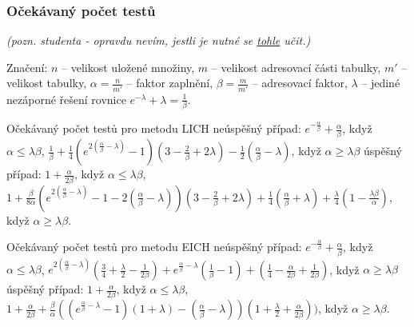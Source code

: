 \documentclass[a4paper,12pt]{article}
\begin{document}
\subsubsection{Očekávaný počet testů}
\emph{(pozn. studenta - opravdu nevím, jestli je nutné se \underline{tohle} učit.)}

Značení: $n$ -- velikost uložené množiny,\newline 
$m$ -- velikost adresovací části tabulky,\newline 
$m'$ -- velikost tabulky,\newline 
$\alpha =\frac n{m'}$ -- faktor zaplnění,\newline 
$\beta =\frac m{m'}$ -- adresovací faktor,\newline 
$\lambda$ -- jediné nezáporné řešení rovnice $e^{
-\lambda}+\lambda =\frac 1{\beta}$.

Očekávaný počet testů pro metodu LICH\newline 
neúspěšný případ:\newline 
\phantom{---}$e^{-\frac {\alpha}{\beta}}+\frac {\alpha}{\beta}$, když  $
\alpha\le\lambda\beta$, \newline 
\phantom{---}$\frac 1{\beta}+\frac 14(e^{2(\frac {\alpha}{\beta}-
\lambda )}-1)(3-\frac 2{\beta}+2\lambda )-\frac 12(\frac {\alpha}{
\beta}-\lambda )$, když $\alpha\ge\lambda\beta$\newline 
úspěšný případ:\newline 
\phantom{---}$1+\frac {\alpha}{2\beta}$, když $\alpha\le\lambda
\beta$, \newline 
\phantom{---}$1+\frac {\beta}{8\alpha}(e^{2(\frac {\alpha}{\beta}
-\lambda )}-1-2(\frac {\alpha}{\beta}-\lambda ))(3-\frac 2{\beta}
+2\lambda )+\frac 14(\frac {\alpha}{\beta}+\lambda )+\frac {\lambda}
4(1-\frac {\lambda\beta}{\alpha})$, 
když $\alpha\ge\lambda\beta$.

Očekávaný počet testů pro metodu EICH\newline 
neúspěšný případ:\newline 
\phantom{---}$e^{-\frac {\alpha}{\beta}}+\frac {\alpha}{\beta}$, když  $
\alpha\le\lambda\beta$, \newline 
\phantom{---}$e^{2(\frac {\alpha}{\beta}-\lambda )}(\frac 34+\frac {
\lambda}2-\frac 1{2\beta})+e^{\frac {\alpha}{\beta}-\lambda}(\frac 
1{\beta}-1)+(\frac 14-\frac {\alpha}{2\beta}+\frac 1{2\beta})$, když $
\alpha\ge\lambda\beta$\newline 
úspěšný případ:\newline 
\phantom{---}$1+\frac {\alpha}{2\beta}$, když $\alpha\le\lambda
\beta$, \newline 
\phantom{---}$1+\frac {\alpha}{2\beta}+\frac {\beta}{\alpha}((e^{\frac {
\alpha}{\beta}-\lambda}-1)(1+\lambda )-(\frac {\alpha}{\beta}-\lambda 
))(1+\frac {\lambda}2+\frac {\alpha}{2\beta}))$, když $\alpha\ge
\lambda\beta$.
\end{document}
